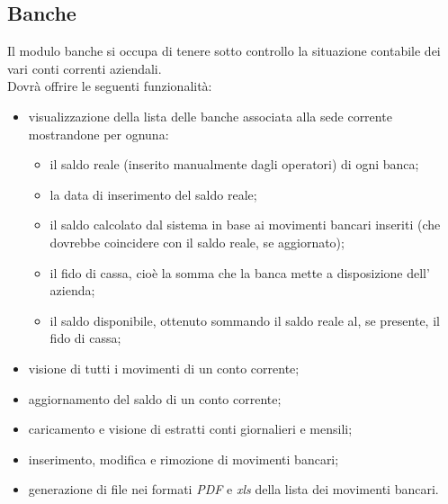 	\subsection{Banche}
	\label{mod:banche}
	Il modulo banche si occupa di tenere sotto controllo la situazione contabile dei vari conti correnti aziendali.\\
	Dovrà offrire le seguenti funzionalità:
	\begin{itemize}
		\item visualizzazione della lista delle banche associata alla sede corrente mostrandone per ognuna:
			\begin{itemize}
				\item il saldo reale (inserito manualmente dagli operatori) di ogni banca;
				\item la data di inserimento del saldo reale;
				\item il saldo calcolato dal sistema in base ai movimenti bancari inseriti (che dovrebbe coincidere con il saldo reale, se aggiornato);
				\item il fido di cassa, cioè la somma che la banca mette a disposizione dell' azienda;
				\item il saldo disponibile, ottenuto sommando il saldo reale al, se presente, il fido di cassa;
			\end{itemize}
		\item visione di tutti i movimenti di un conto corrente;
		\item aggiornamento del saldo di un conto corrente;
		\item caricamento e visione di estratti conti giornalieri e mensili;
		\item inserimento, modifica e rimozione di movimenti bancari;
		\item generazione di file nei formati \textit{PDF} e \textit{xls} della lista dei movimenti bancari.
	\end{itemize}
	

